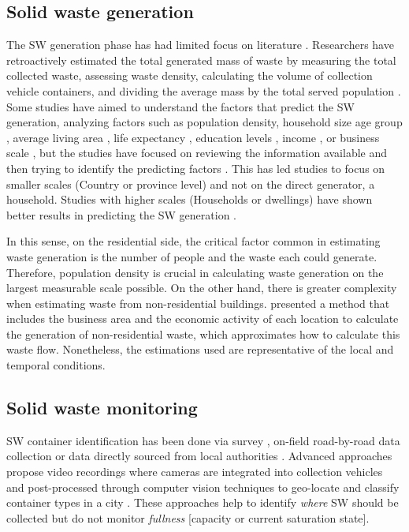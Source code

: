 \documentclass[authoryear,preprint,review,doubleblind, 12pt]{elsarticle}
\begin{document}
   \subsection{Solid waste generation}
   The SW generation phase has had limited focus on literature \citep{Alshaikh_Abdelfatah_2024}. Researchers have retroactively estimated the total generated mass of waste by measuring the total collected waste, assessing waste density, calculating the volume of collection vehicle containers, and dividing the average mass by the total served population \citep{ibiebele1986rapid}. Some studies have aimed to understand the factors that predict the SW generation, analyzing factors such as population density, household size \citep{Lebersorger_Beigl_2011} age group \citep{sinha2016impact}, average living area \citep{Nguyen_Chuang_Chen_Chang_2020}, life expectancy \citep{Vieira_Matheus_2017}, education levels \citep{Grazhdani_2016}, income \citep{Grazhdani_2016, Kaza2018}, or business scale \citep{Nguyen_Chuang_Chen_Chang_2020}, but the studies have focused on reviewing the information available and then trying to identify the predicting factors \citep{Izquierdo-Horna_Kahhat_Vázquez-Rowe_2022}. This has led studies to focus on smaller scales (Country or province level) and not on the direct generator, a household. Studies with higher scales (Households or dwellings) have shown better results in predicting the SW generation \citep{Torrente-Velásquez_Ripa_Chifari_Giampietro_2021}.

   In this sense, on the residential side, the critical factor common in estimating waste generation is the number of people and the waste each could generate. Therefore, population density is crucial in calculating waste generation on the largest measurable scale possible. On the other hand, there is greater complexity when estimating waste from non-residential buildings. \citet{Karadimas2008} presented a method that includes the business area and the economic activity of each location to calculate the generation of non-residential waste, which approximates how to calculate this waste flow. Nonetheless, the estimations used are representative of the local and temporal conditions. 
   
    \subsection{Solid waste monitoring}
    \label{subsubsec:Monitoring}
    SW container identification has been done via survey \citep{alsobkySmartFramework23}, on-field road-by-road data collection \citep{ kiranCharacterizationQuantification23} or data directly sourced from local authorities \citep{Hina2020}. Advanced approaches propose video recordings where cameras are integrated into collection vehicles and post-processed through computer vision techniques to geo-locate and classify container types in a city \citep{Moral2022}. These approaches help to identify \textit{where} SW should be collected but do not monitor \textit{fullness} [capacity or current saturation state].
    
\end{document}
